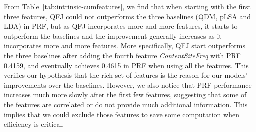 From Table~\ref{tab:intrinsic-cumfeatures}, we find that when starting with the first three features, QFJ could not outperforms the three baselines (QDM, pLSA and LDA) in PRF, but as QFJ incorporates more and more features, it starts to outperform the baselines and the improvement generally increases as it incorporates more and more features. More specifically, QFJ start outperforms the three baselines after adding the fourth feature \textit{ContentSiteFreq} with PRF 0.4159, and eventually achieves 0.4615 in PRF when using all the features. This verifies our hypothesis that the rich set of features is the reason for our models' improvements over the baselines. However, we also notice that PRF performance increases much more slowly after the first few features, suggesting that some of the features are correlated or do not provide much additional information. This implies that we could exclude those features to save some computation when efficiency is critical.

